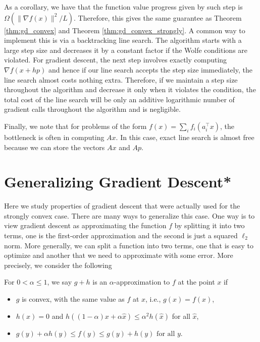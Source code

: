 As a corollary, we have that the function value progress given by
such step is $\Omega(\|\nabla f(x)\|^{2}/L)$. Therefore, this gives
the same guarantee as Theorem \ref{thm:gd_convex} and Theorem \ref{thm:gd_convex_strongly}.
A common way to implement this is via a backtracking line search.
The algorithm starts with a large step size and decreases it by a
constant factor if the Wolfe conditions are violated. For gradient
descent, the next step involves exactly computing $\nabla f(x+hp)$
and hence if our line search accepts the step size immediately, the
line search almost costs nothing extra. Therefore, if we maintain
a step size throughout the algorithm and decrease it only when it
violates the condition, the total cost of the line search will be
only an additive logarithmic number of gradient calls throughout the
algorithm and is negligible.

Finally, we note that for problems of the form $f(x)=\sum_{i}f_{i}(a^{\top}_{i}x)$,
the bottleneck is often in computing $Ax$. In this case, exact line
search is almost free because we can store the vectors $Ax$ and $Ap$.

\section{Generalizing Gradient Descent{*}}

Here we study properties of gradient descent that were actually used
for the strongly convex case. There are many ways to generalize this
case. One way is to view gradient descent as approximating the function
$f$ by splitting it into two terms, one is the first-order approximation
and the second is just a squared $\ell_{2}$ norm. More generally,
we can split a function into two terms, one that is easy to optimize
and another that we need to approximate with some error. More precisely,
we consider the following 
\begin{defn}
For $0<\alpha\leq1$, we say $g+h$ is an $\alpha$-approximation
to $f$ at the point $x$ if
\begin{itemize}
\item $g$ is convex, with the same value as $f$ at $x$, i.e., $g(x)=f(x)$,
\item $h(x)=0$ and $h((1-\alpha)x+\alpha\widehat{x})\leq\alpha^{2}h(\widehat{x})$
for all $\widehat{x}$,
\item $g(y)+\alpha h(y)\leq f(y)\leq g(y)+h(y)\text{ for all }y.$ 
\end{itemize}
\end{defn}

